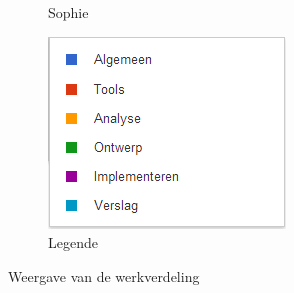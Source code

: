 \documentclass[i1]{oss}
\begin{document}
\begin{figure}[h!]
\begin{subfigure}[hb]{0.20\textwidth}
                \caption{Sophie}
        \end{subfigure}%
                \begin{subfigure}[hb]{0.20\textwidth}
                \centering
                \includegraphics[width=\textwidth]{legende}
                \caption{Legende}
        \end{subfigure}%


 \caption{Weergave van de werkverdeling}
\label{fig:werkverdeling}
\end{figure}
\end{document}
